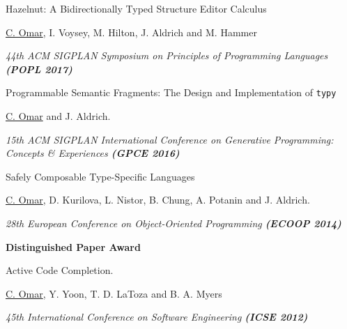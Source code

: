 \documentclass[10pt,letterpaper]{article}
\renewenvironment{itemize}{
  \begin{list}{}{
    \setlength{\leftmargin}{1.5em}
    \setlength{\itemsep}{0.25em}
    \setlength{\parskip}{0pt}
    \setlength{\parsep}{0.25em}
  }
}{
  \end{list}
}
\begin{document}
\begin{enumerate}
\item {Hazelnut: A Bidirectionally Typed Structure Editor Calculus}
  \begin{itemize}
    \item \underline{C. Omar}, I. Voysey, M. Hilton, J. Aldrich and M. Hammer
    \item \textit{44th ACM SIGPLAN Symposium on Principles of Programming Languages \textbf{(POPL 2017)}}
  \end{itemize}
\item {Programmable Semantic Fragments: The Design and Implementation of \texttt{typy}}
  \begin{itemize}
    \item \underline{C. Omar} and J. Aldrich.
    \item \textit{15th ACM SIGPLAN International Conference on Generative Programming: Concepts \& Experiences \textbf{(GPCE 2016)}}
  \end{itemize}
\item {Safely Composable Type-Specific Languages}
  \begin{itemize}
    \item \underline{C. Omar}, D. Kurilova, L. Nistor, B. Chung, A. Potanin and J. Aldrich.
    \item \textit{28th European Conference on Object-Oriented Programming \textbf{(ECOOP 2014)}}
    \item \textbf{Distinguished Paper Award}
  \end{itemize}
\item {Active Code Completion}.
  \begin{itemize}
      \item \underline{C. Omar}, Y. Yoon, T. D. LaToza and B. A. Myers
      \item \textit{45th International Conference on Software Engineering \textbf{(ICSE 2012)}}

\end{itemize}
\end{enumerate}
\end{document}
